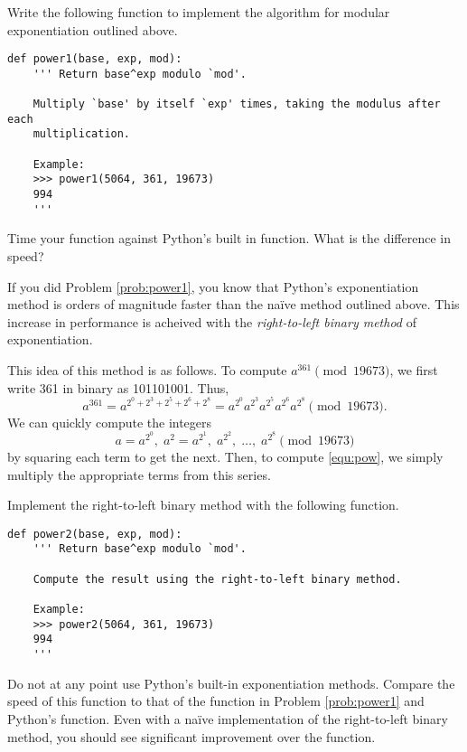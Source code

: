\begin{problem}\label{prob:power1}
Write the following function to implement the algorithm for modular exponentiation outlined above.
\begin{lstlisting}
def power1(base, exp, mod):
    ''' Return base^exp modulo `mod'.
    
    Multiply `base' by itself `exp' times, taking the modulus after each 
    multiplication.
    
    Example:
    >>> power1(5064, 361, 19673)
    994
    '''
\end{lstlisting}

Time your function against Python's built in  function.
What is the difference in speed?
\end{problem}

If you did Problem \ref{prob:power1}, you know that Python's exponentiation method is orders of magnitude faster than the na\"ive method outlined above.
This increase in performance is acheived with the \emph{right-to-left binary method} of exponentiation.

This idea of this method is as follows. 
To compute $a^{361} \pmod{19673}$, we first write 361 in binary as 101101001. Thus,
\begin{equation}\label{equ:pow}
a^{361} = a^{2^0+2^3+2^5+2^6+2^8} = a^{2^0}a^{2^3}a^{2^5}a^{2^6}a^{2^8} \pmod{19673}.
\end{equation}
We can quickly compute the integers
\[
a=a^{2^0},\; a^2=a^{2^1}, \;a^{2^2}, \;\ldots, \;a^{2^8} \pmod{19673}
\]
by squaring each term to get the next. 
Then, to compute \eqref{equ:pow}, we simply multiply the appropriate terms from this series.

\begin{problem}
Implement the right-to-left binary method with the following function.
\begin{lstlisting}
def power2(base, exp, mod):
    ''' Return base^exp modulo `mod'.
    
    Compute the result using the right-to-left binary method.
    
    Example:
    >>> power2(5064, 361, 19673)
    994
    '''
\end{lstlisting}
Do not at any point use Python's built-in exponentiation methods.
Compare the speed of this function to that of the function in Problem \ref{prob:power1} and Python's  function.
Even with a na\"ive implementation of the right-to-left binary method, you should see significant improvement over the  function.
\end{problem}

